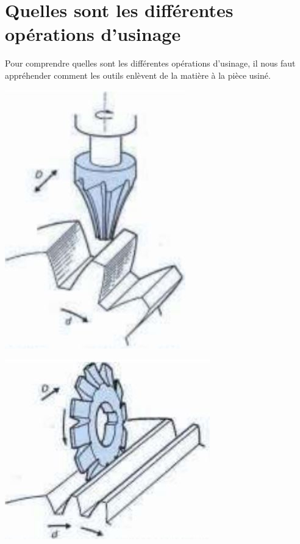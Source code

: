 \documentclass[12pt]{article}
\begin{document}
\section{Quelles sont les différentes opérations d'usinage}


Pour comprendre quelles sont les différentes opérations d'usinage, il nous faut appréhender comment les outils enlèvent de la matière à la pièce usiné.


\begin{minipage}[t]{.55\linewidth}
\includegraphics[width=0.5\linewidth]{Images/C1.JPG}
\end{minipage}
\begin{minipage}[t]{.44\linewidth}
\includegraphics[width=0.7\linewidth]{Images/C2.JPG}
\end{minipage}

\end{document}
